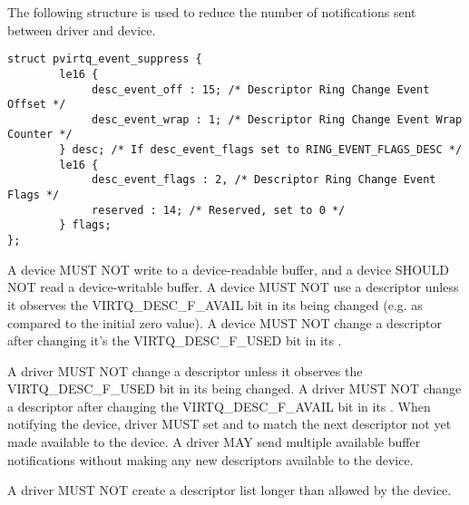 The following structure is used to reduce the number of
notifications sent between driver and device.

\begin{lstlisting}
struct pvirtq_event_suppress {
        le16 {
             desc_event_off : 15; /* Descriptor Ring Change Event Offset */
             desc_event_wrap : 1; /* Descriptor Ring Change Event Wrap Counter */
        } desc; /* If desc_event_flags set to RING_EVENT_FLAGS_DESC */
        le16 {
             desc_event_flags : 2, /* Descriptor Ring Change Event Flags */
             reserved : 14; /* Reserved, set to 0 */
        } flags;
};
\end{lstlisting}

A device MUST NOT write to a device-readable buffer, and a device SHOULD NOT
read a device-writable buffer.
A device MUST NOT use a descriptor unless it observes
the VIRTQ_DESC_F_AVAIL bit in its  being changed
(e.g. as compared to the initial zero value).
A device MUST NOT change a descriptor after changing it's
the VIRTQ_DESC_F_USED bit in its .

A driver MUST NOT change a descriptor unless it observes
the VIRTQ_DESC_F_USED bit in its  being changed.
A driver MUST NOT change a descriptor after changing
the VIRTQ_DESC_F_AVAIL bit in its .
When notifying the device, driver MUST set
 and
 to match the next descriptor
not yet made available to the device.
A driver MAY send multiple available buffer notifications without making
any new descriptors available to the device.

A driver MUST NOT create a descriptor list longer than allowed
by the device.

